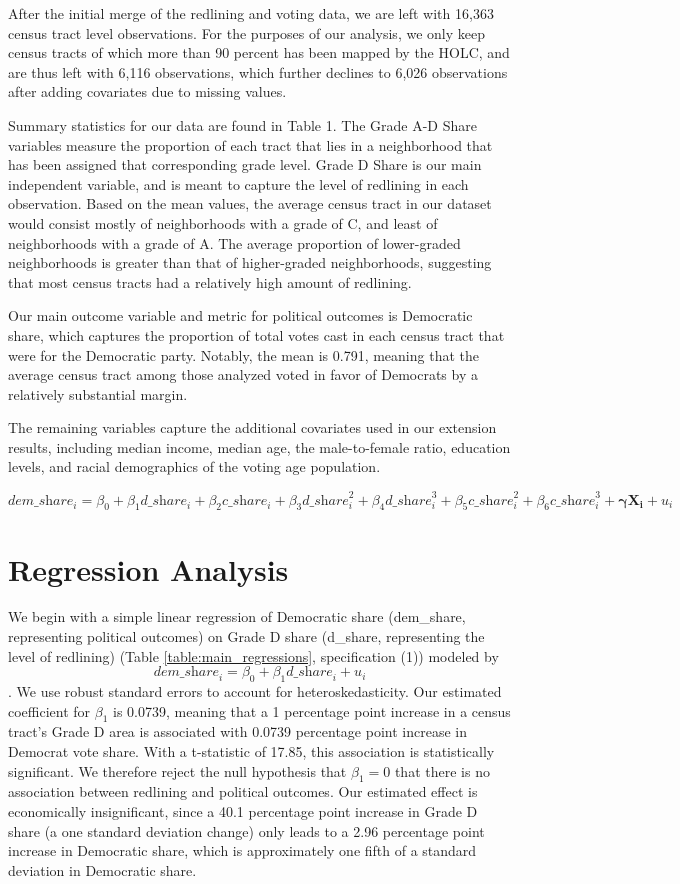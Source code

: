 \documentclass{eco_375_paper}
\begin{document}
After the initial merge of the redlining and voting data, we are left with 16,363 census tract level observations. For the purposes of our analysis, we only keep census tracts of which more than 90 percent has been mapped by the HOLC, and are thus left with 6,116 observations, which further declines to 6,026 observations after adding covariates due to missing values.

Summary statistics for our data are found in Table 1. The Grade A-D Share variables measure the proportion of each tract that lies in a neighborhood that has been assigned that corresponding grade level. Grade D Share is our main independent variable, and is meant to capture the level of redlining in each observation. Based on the mean values, the average census tract in our dataset would consist mostly of neighborhoods with a grade of C, and least of neighborhoods with a grade of A. The average proportion of lower-graded neighborhoods is greater than that of higher-graded neighborhoods, suggesting that most census tracts had a relatively high amount of redlining.

Our main outcome variable and metric for political outcomes is Democratic share, which captures the proportion of total votes cast in each census tract that were for the Democratic party. Notably, the mean is 0.791, meaning that the average census tract among those analyzed voted in favor of Democrats by a relatively substantial margin.

The remaining variables capture the additional covariates used in our extension results, including median income, median age, the male-to-female ratio, education levels, and racial demographics of the voting age population. 

${\textit{dem\_share}_i} = {\beta_0} + {\beta_1}{\textit{d\_share}_i} + {\beta_2}{\textit{c\_share}_i} + {\beta_3}{\textit{d\_share}_i^2} + {\beta_4}{\textit{d\_share}_i^3} + {\beta_5}{\textit{c\_share}_i^2} + {\beta_6}{\textit{c\_share}_i^3} + \boldsymbol{{\gamma}} \boldsymbol{X_i} + u_i$
\section*{Regression Analysis}
We begin with a simple linear regression of Democratic share (dem\_share, representing political outcomes) on Grade D share (d\_share, representing the level of redlining) (Table \ref{table:main_regressions}, specification (1)) modeled by $${\textit{dem\_share}_i} = {\beta_0} + {\beta_1}{\textit{d\_share}_i} + u_i$$. We use robust standard errors to account for heteroskedasticity. Our estimated coefficient for $\beta_1$ is 0.0739, meaning that a 1 percentage point increase in a census tract’s Grade D area is associated with 0.0739 percentage point increase in Democrat vote share. With a t-statistic of 17.85, this association is statistically significant. We therefore reject the null hypothesis that $\beta_1 = 0$ that there is no association between redlining and political outcomes. Our estimated effect is economically insignificant, since a 40.1 percentage point increase in Grade D share (a one standard deviation change) only leads to a 2.96 percentage point increase in Democratic share, which is approximately one fifth of a standard deviation in Democratic share.
\end{document}

